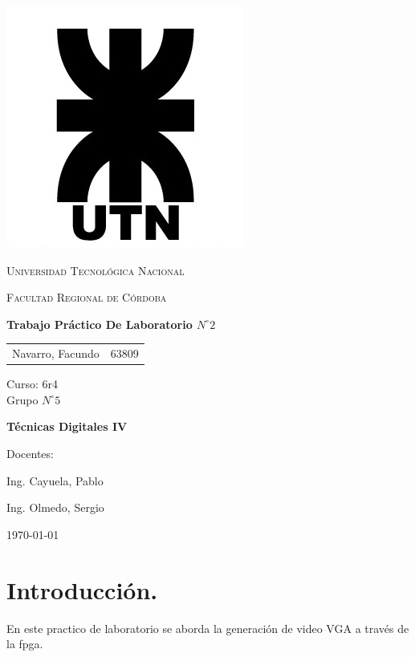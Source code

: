 \documentclass[11pt, a4paper]{article}
\begin{document}
\begin{titlepage}
 \centering
	\includegraphics[scale=0.80]{Imagenes/LOGO.jpg} \par
 	\vspace{1cm}
 	{\scshape\LARGE Universidad Tecnológica Nacional \par}
 	{\scshape\large Facultad Regional de Córdoba \par}
 	\vspace{1cm}
	{\bfseries \Large Trabajo Práctico De Laboratorio $N^{\circ} 2$\par}
 	\vspace{1.5cm}

	\begin{tabular}{ll}
		Navarro, Facundo		&	63809 	
	\end{tabular}
	
	\vspace{1cm}
	Curso: 6r4 \\
	Grupo $N^{\circ} 5$
 	\vfill
	{\bfseries \Large Técnicas Digitales IV\par}
	
	\vspace{1.5cm}
	Docentes: \par
	Ing. Cayuela, Pablo \par
	Ing. Olmedo, Sergio \par

 	\vfill
	{\large \today\par}
\end{titlepage}
	
	
\tableofcontents
\clearpage

\section{Introducción.}
	En este practico de laboratorio se aborda la generación de video VGA a través de la fpga.  
\end{document}
